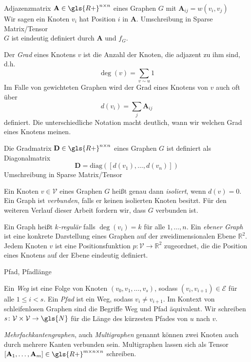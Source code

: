 Adjazenzmatrix $\mathbf{A} \in \gls{R+}^{n \times n}$ eines Graphen $G$ mit $\mathbf{A}_{ij} = w(v_i, v_j)$\\
Wir sagen ein Knoten $v_i$ hat Position $i$ in $\mathbf{A}$.
Umschreibung in Sparse Matrix/Tensor\\

$G$ ist eindeutig definiert durch $\mathbf{A}$ und $f_G$.

Der \emph{Grad} eines Knotens $v$ ist die Anzahl der Knoten, die adjazent zu ihm sind, d.h.
\begin{equation}
  \deg\left(v\right) = \sum_{v \sim u} 1
\end{equation}
Im Falle von gewichteten Graphen wird der Grad eines Knotens von $v$ auch oft über
\begin{equation}
  d\left(v_i\right) = \sum_{j} \mathbf{A}_{ij}
\end{equation}
definiert.
Die unterschiedliche Notation macht deutlich, wann wir welchen Grad eines Knotens meinen.

Die Gradmatrix $\mathbf{D} \in \gls{R+}^{n \times n}$ eines Graphen $G$ ist definiert als Diagonalmatrix
\begin{equation}
  \mathbf{D} = \text{diag}\left( \left[ d\left(v_1\right), \ldots, d\left(v_n\right) \right] \right)
\end{equation}
Umschreibung in Sparse Matrix/Tensor

Ein Knoten $v \in \mathcal{V}$ eines Graphen $G$ heißt genau dann \emph{isoliert}, wenn $d\left(v\right) = 0$.\\
Ein Graph ist \emph{verbunden}, falls er keinen isolierten Knoten besitzt.
Für den weiteren Verlauf dieser Arbeit fordern wir, dass $G$ verbunden ist.\

Ein Graph heißt \emph{$k$-regulär} falls $\deg\left(v_i\right) = k$ für alle $1, \ldots, n$.
Ein \emph{ebener Graph} ist eine konkrete Darstellung eines Graphen auf der zweidimensionalen Ebene $\mathbb{R}^2$.
Jedem Knoten $v$ ist eine Positionsfunktion $p \colon \mathcal{V} \to \mathbb{R}^2$ zugeordnet, die die Position eines Knotens auf der Ebene eindeutig definiert.

Pfad, Pfadlänge

Ein \emph{Weg} ist eine Folge von Knoten $\left( v_0, v_1, \ldots, v_s \right)$, sodass $(v_i, v_{i+1}) \in \mathcal{E}$ für alle $1 \leq i < s$.
Ein \emph{Pfad} ist ein Weg, sodass $v_i \neq v_{i+1}$.
Im Kontext von schleifenlosen Graphen sind die Begriffe Weg und Pfad äquivalent.
Wir schreiben $s \colon \mathcal{V} \times \mathcal{V} \to \gls{N}$ für die Länge des kürzesten Pfades von $u$ nach $v$.

\emph{Mehrfachkantengraphen}, auch \emph{Multigraphen} genannt können zwei Knoten auch durch mehrere Kanten verbunden sein.
Multigraphen lassen sich als Tensor $\left[\mathbf{A}_1, \ldots, \mathbf{A}_m\right] \in \gls{R+}^{m \times n \times n}$ schreiben.
